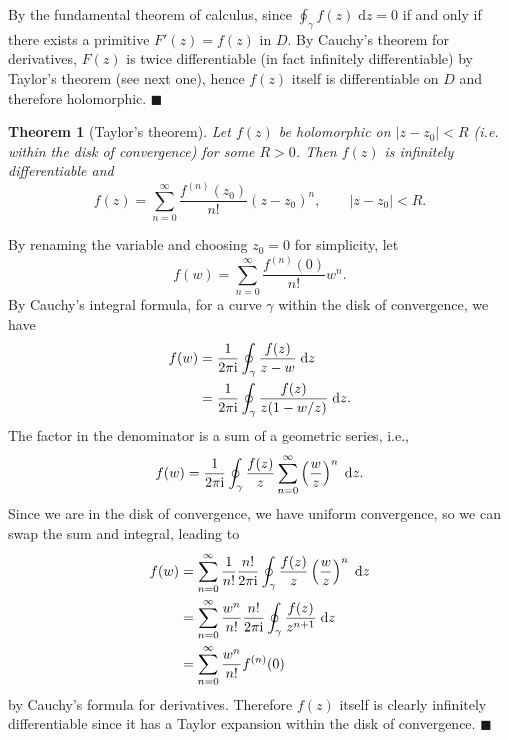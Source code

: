 \documentclass[letter-paper]{tufte-book}
\newtheorem{theorem}{\color{pastel-blue}Theorem}[section]
\newenvironment{proof}[1][Proof]{\begin{trivlist}
\item[\hskip \labelsep {\bfseries #1}]}{\end{trivlist}}
\newcommand{\zi}{{\rm i}}
\newcommand{\qed}{\hfill$\blacksquare$}
\begin{document}
\begin{proof}
  By the fundamental theorem of calculus, since $\oint_\gamma f(z)\; \mathrm{d}z
  = 0$ if and only if there exists a primitive $F'(z) = f(z)$ in $D$. By
  Cauchy's theorem for derivatives, $F(z)$ is twice differentiable (in fact
  infinitely differentiable) by Taylor's theorem (see next one), hence $f(z)$
  itself is differentiable on $D$ and therefore holomorphic. \qed
\end{proof}

\begin{theorem}[Taylor's theorem]
  Let $f(z)$ be holomorphic on $|z - z_0| < R$ (i.e. within the disk of
  convergence) for some $R > 0$. Then $f(z)$ is infinitely differentiable and
  \begin{equation}
    f(z) = \sum^\infty_{n=0} \frac{f^{(n)}(z_0)}{n!} (z - z_0)^n, \qquad |z - z_0| < R.
  \end{equation}
\end{theorem}

\begin{proof}
  By renaming the variable and choosing $z_0 = 0$ for simplicity, let 
  \begin{equation*}
    f(w) = \sum^\infty_{n=0} \frac{f^{(n)}(0)}{n!} w^n.
  \end{equation*}
  By Cauchy's integral formula, for a curve $\gamma$ within the disk of
  convergence, we have
  \begin{align*}
    f(w) &= \frac{1}{2\pi\zi} \oint_\gamma \frac{f(z)}{z - w}\; \mathrm{d}z\\
      &= \frac{1}{2\pi\zi} \oint_\gamma \frac{f(z)}{z (1 - w/z)}\; \mathrm{d}z.
  \end{align*}
  The factor in the denominator is a sum of a geometric series, i.e.,
  \begin{align*}
    f(w) = \frac{1}{2\pi\zi} \oint_\gamma \frac{f(z)}{z} \sum^\infty_{n=0} \left(\frac{w}{z}\right)^n\; \mathrm{d}z.
  \end{align*}
  Since we are in the disk of convergence, we have uniform convergence, so we
  can swap the sum and integral, leading to
  \begin{align*}
    f(w) &= \sum^\infty_{n=0} \frac{1}{n!} \frac{n!}{2\pi\zi} \oint_\gamma \frac{f(z)}{z} \left(\frac{w}{z}\right)^n\; \mathrm{d}z \\
      &= \sum^\infty_{n=0} \frac{w^n}{n!} \frac{n!}{2\pi\zi} \oint_\gamma \frac{f(z)}{z^{n+1}}\; \mathrm{d}z\\
      &= \sum^\infty_{n=0} \frac{w^n}{n!} f^{(n)}(0)
  \end{align*}
  by Cauchy's formula for derivatives. Therefore $f(z)$ itself is clearly
  infinitely differentiable since it has a Taylor expansion within the disk of
  convergence.
  \qed
\end{proof}
\end{document}
